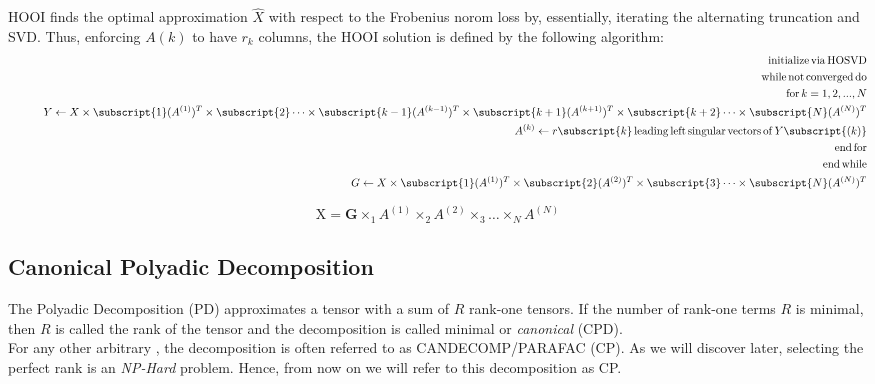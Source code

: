 HOOI finds the optimal approximation $\hat{X}$ with respect to the Frobenius norom loss by, essentially, iterating the alternating truncation and SVD. Thus, enforcing $A(k)$ to have $r_k$ columns, the HOOI solution is defined by the following algorithm: 
\begin{eqnarray}
&\,&\mathrm{initialize\,via\,HOSVD} \nonumber\\
&\,&\mathrm{while\,not\,converged\,do} \nonumber\\
&\,&\quad \mathrm{for}\, k = 1, 2, ..., N \nonumber\\
&\,&\quad\quad Y \leftarrow X \times\subscript{1} (A^{(1)})^T \times\subscript{2} \cdots \times\subscript{k-1} (A^{(k-1)})^T \times\subscript{k+1} (A^{(k+1)})^T \times\subscript{k+2} \cdots \times\subscript{N} (A^{(N)})^T  \nonumber\\
&\,&\quad\quad A^{(k)} \leftarrow r\subscript{k}\,\mathrm{leading\,left\,singular\,vectors\,of}\,Y\subscript{(k)} \nonumber\\
&\,&\quad \mathrm{end\,for} \nonumber\\
&\,&\mathrm{end\,while} \nonumber\\
&\,&G \leftarrow X \times\subscript{1} (A^{(1)})^T \times\subscript{2} (A^{(2)})^T \times\subscript{3} \cdots \times\subscript{N} (A^{(N)})^T  \nonumber\\
\end{eqnarray}







\begin{equation}
    \mathrm{X} = \mathbf{G} \times_{1} A^{(1)} \times_{2} A^{(2)} \times_{3} \ldots \times_{N} A^{(N)}
\end{equation}

\subsection{Canonical Polyadic Decomposition}
\begin{comment}
$\tensor{A} \otimes \tensor{B}$ denote the outer product between an $N\th$-order tensor $\tensor{A}$ and an $M\th$-order tensor $\tensor{B}$, then $\tensor{A} \otimes \tensor{B}$ is the $(N+M)\th$-order tensor defined by $(\tensor{A} \otimes \tensor{B})_{i_1\cdots i_N\,j_1\cdots j_M} = a_{i_1\cdots i_N} \cdot b_{j_1\cdots j_M}$. 
\end{comment}
The Polyadic Decomposition (PD) \parencite{tensor2009kolda} approximates a tensor with a sum of $R$ rank-one tensors. If the number of rank-one terms $R$ is minimal, then $R$ is called the rank of the tensor and the decomposition is called minimal or \emph{canonical} (CPD). \\
For any other arbitrary , the decomposition is often referred to as CANDECOMP/PARAFAC (CP). As we will discover later, selecting the perfect rank is an \emph{NP-Hard} problem. Hence, from now on we will refer to this decomposition as CP. \newline 

